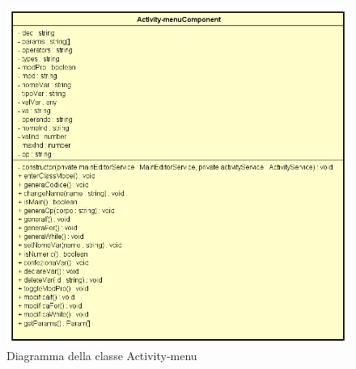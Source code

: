 \begin{figure}[h!]
	\centering
	\includegraphics[scale=0.8]{res/sections/SpecificaFrontEnd/Components/Disegnetti/activity-menu.png}
	\caption{Diagramma della classe Activity-menu}
\end{figure}

